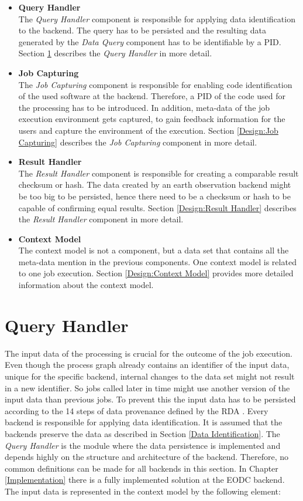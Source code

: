 \documentclass[draft,final]{vutinfth} %
\begin{document}
 \begin{itemize}
	\item \textbf{Query Handler} \\
	The \textit{Query Handler} component is responsible for applying data identification to the backend. The query has to be persisted and the resulting data generated by the \textit{Data Query} component has to be identifiable by a PID. Section \ref{Design:Data Identification} describes the \textit{Query Handler} in more detail.     
	\item \textbf{Job Capturing} \\ 
	The \textit{Job Capturing} component is responsible for enabling code identification of the used software at the backend. Therefore, a PID of the code used for the processing has to be introduced. In addition, meta-data of the job execution environment gets captured, to gain feedback information for the users and capture the environment of the execution. Section \ref{Design:Job Capturing} describes the \textit{Job Capturing} component in more detail.
	\item \textbf{Result Handler} \\
	The \textit{Result Handler} component is responsible for creating a comparable result checksum or hash. The data created by an earth observation backend might be too big to be persisted, hence there need to be a checksum or hash to be capable of confirming equal results. Section \ref{Design:Result Handler} describes the \textit{Result Handler} component in more detail.   
	\item \textbf{Context Model} \\ 
	The context model is not a component, but a data set that contains all the meta-data mention in the previous components. One context model is related to one job execution. Section \ref{Design:Context Model} provides more detailed information about the context model. 
\end{itemize}

\section{Query Handler}\label{Design:Data Identification}
The input data of the processing is crucial for the outcome of the job execution. Even though the process graph already contains an identifier of the input data, unique for the specific backend, internal changes to the data set might not result in a new identifier. So jobs called later in time might use another version of the input data than previous jobs. To prevent this the input data has to be persisted according to the 14 steps of data provenance defined by the RDA \cite{rauber2016identification}. Every backend is responsible for applying data identification. It is assumed that the backends preserve the data as described in Section \ref{Data Identification}. The \textit{Query Handler} is the module where the data persistence is implemented and depends highly on the structure and architecture of the backend. Therefore, no common definitions can be made for all backends in this section. In Chapter \ref{Implementation} there is a fully implemented solution at the EODC backend. The input data is represented in the context model by the following element: 
\end{document}

